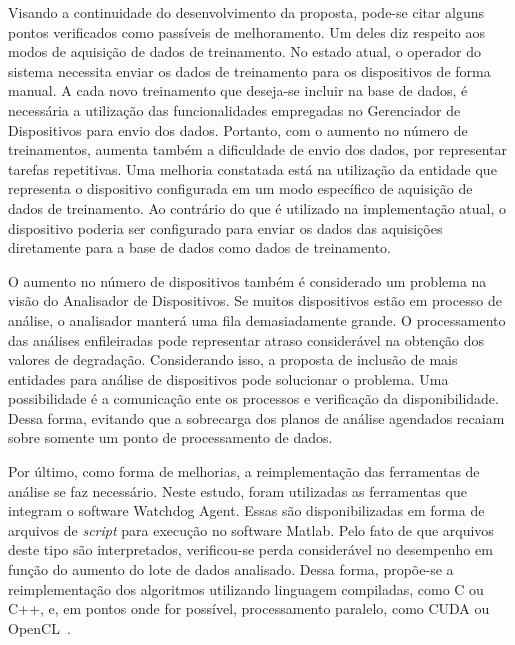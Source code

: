 Visando a continuidade do desenvolvimento da proposta, pode-se citar alguns pontos verificados como
passíveis de melhoramento. Um deles diz respeito aos modos de aquisição de dados de treinamento. No
estado atual, o operador do sistema necessita enviar os dados de treinamento para os dispositivos de
forma manual. A cada novo treinamento que deseja-se incluir na base de dados, é necessária a
utilização das funcionalidades empregadas no Gerenciador de Dispositivos para envio dos dados.
Portanto, com o aumento no número de treinamentos, aumenta também a dificuldade de envio dos dados,
por representar tarefas repetitivas. Uma melhoria constatada está na utilização da entidade que
representa o dispositivo configurada em um modo específico de aquisição de dados de treinamento. Ao
contrário do que é utilizado na implementação atual, o dispositivo poderia ser configurado para
enviar os dados das aquisições diretamente para a base de dados como dados de treinamento.

O aumento no número de dispositivos também é considerado um problema na visão do Analisador de
Dispositivos. Se muitos dispositivos estão em processo de análise, o analisador manterá uma fila
demasiadamente grande. O processamento das análises enfileiradas pode representar atraso
considerável na obtenção dos valores de degradação. Considerando isso, a proposta de inclusão de
mais entidades para análise de dispositivos pode solucionar o problema. Uma possibilidade é a
comunicação ente os processos e verificação da disponibilidade. Dessa forma, evitando que a
sobrecarga dos planos de análise agendados recaiam sobre somente um ponto de processamento de dados.

Por último, como forma de melhorias, a reimplementação das ferramentas de análise se faz necessário.
Neste estudo, foram utilizadas as ferramentas que integram o software Watchdog Agent. Essas são
disponibilizadas em forma de arquivos de \textit{script} para execução no software Matlab. Pelo fato
de que arquivos deste tipo são interpretados, verificou-se perda considerável no desempenho em
função do aumento do lote de dados analisado. Dessa forma, propõe-se a reimplementação dos
algoritmos utilizando linguagem compiladas, como C ou C++, e, em pontos onde for possível,
processamento paralelo, como CUDA ou OpenCL~\cite{kirk2012programming}.
